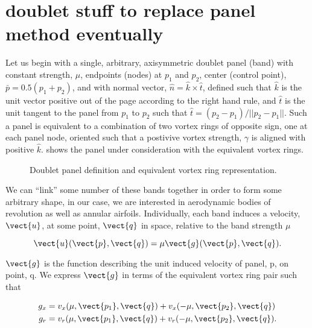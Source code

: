 \section{doublet stuff to replace panel method eventually}

Let us begin with a single, arbitrary, axisymmetric doublet panel (band)
with constant strength, \(\mu\),
endpoints (nodes) at \(p_1\) and \(p_2\),
center (control point), \(\bar{p}=0.5(p_1+p_2)\),
and with normal vector, \(\hat{n}=\hat{k}\times\hat{t}\),
defined such that \(\hat{k}\) is the unit vector positive out of the page according to the right hand rule,
and \(\hat{t}\) is the unit tangent to the panel from \(p_1\) to \(p_2\)
such that \(\hat{t} = (p_2-p_1)/||p_2-p_1||\).
Such a panel is equivalent to a combination of two vortex rings of opposite sign,
one at each panel node, oriented such that a postivive vortex strength,
\(\gamma\) is aligned with positive \(\hat{k}\).
 shows the panel under consideration with the equivalent vortex rings.

\begin{figure}[h!]
    \centering
    
    \caption{Doublet panel definition and equivalent vortex ring representation.}
    \label{fig:doublet_panel}
\end{figure}

We can ``link'' some number of these bands together in order to form some arbitrary shape,
in our case, we are interested in aerodynamic bodies of revolution as well as annular airfoils.
Individually, each band induces a velocity, \(\vect{u}\), at some point,
\(\vect{q}\) in space, relative to the band strength \(\mu\)

\begin{equation}
    \vect{u}(\vect{p},\vect{q}) = \mu \vect{g}(\vect{p},\vect{q}).
\end{equation}

\where \(\vect{g}\) is the function describing the unit induced velocity of panel, p, on point, q.
We express \(\vect{g}\) in terms of the equivalent vortex ring pair such that

\begin{equation}
    \begin{aligned}
        g_x &= v_x(\mu, \vect{p_1}, \vect{q}) + v_x(-\mu, \vect{p_2}, \vect{q}) \\
        g_r &= v_r(\mu, \vect{p_1}, \vect{q}) + v_r(-\mu, \vect{p_2}, \vect{q}).
    \end{aligned}
\end{equation}

